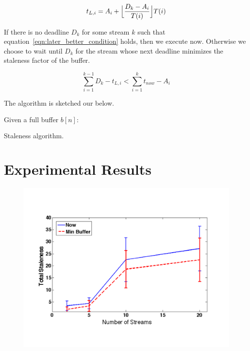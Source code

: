 \begin{equation}
t_{L,i} = A_{i} + \Bigl\lfloor \frac{D_{k}-A_{i}}{T(i)} \Bigr\rfloor T(i)
\label{eqn:last_deadline}
\end{equation}

If there is no deadline $D_{k}$ for some stream $k$ such that equation~\ref{eqn:later_better_condition} holds, then we execute now.  Otherwise we choose to wait
until $D_{k}$ for the stream whose next deadline minimizes the staleness factor of the buffer.


\begin{equation}
\sum_{i=1}^{k-1} D_{k} - t_{L,i} < \sum_{i=1}^{k} t_{now} - A_{i}
\label{eqn:later_better_condition}
\end{equation}

The algorithm is sketched our below.


\begin{algorithm}[h!]
 \SetAlgoLined
 Given a full buffer $b[n]$:\\
 \caption{Staleness algorithm.}
 \label{alg:emd}
\end{algorithm}

\section{Experimental Results}

\begin{figure}[t!] %
\centering
\includegraphics[width=0.9\columnwidth]{figs/staleness_vs_numstreams}
\caption{}
\label{fig:stalevsstreams}
\end{figure}

